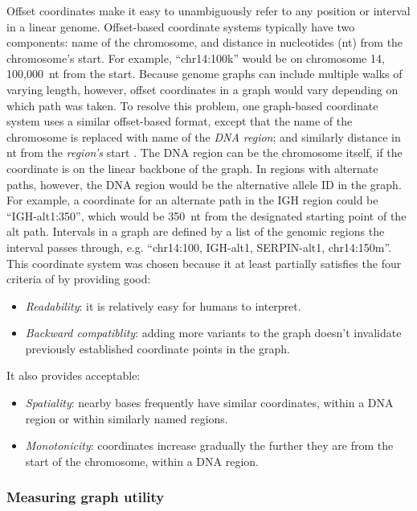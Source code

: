 Offset coordinates make it easy to unambiguously refer to any position or interval in a linear genome.
Offset-based coordinate systems typically have two components: name of the chromosome, and distance in nucleotides (nt) from the chromosome's start.
For example, ``chr14:100k'' would be on chromosome 14, 100,000~nt from the start.
Because genome graphs can include multiple walks of varying length, however, offset coordinates in a graph would vary depending on which path was taken.
To resolve this problem, one graph-based coordinate system uses a similar offset-based format, except that the name of the chromosome is replaced with name of the \emph{DNA region}; and similarly distance in nt from the \emph{region's} start \cite{Rand_2016}. 
The DNA region can be the chromosome itself, if the coordinate is on the linear backbone of the graph.
In regions with alternate paths, however, the DNA region would be the alternative allele ID in the graph.
For example, a coordinate for an alternate path in the IGH region could be ``IGH-alt1:350'', which would be 350~nt from the designated starting point of the alt path.
Intervals in a graph are defined by a list of the genomic regions the interval passes through, e.g. ``chr14:100, IGH-alt1, SERPIN-alt1, chr14:150m''.
This coordinate system was chosen because it at least partially satisfies the four criteria of \citeauthor{Rand_2016} by providing good:
\begin{itemize}
    \item \emph{Readability}: it is relatively easy for humans to interpret.
    \item \emph{Backward compatiblity}: adding more variants to the graph doesn't invalidate previously established coordinate points in the graph.
\end{itemize}
It also provides acceptable:
\begin{itemize}
    \item \emph{Spatiality}: nearby bases frequently have similar coordinates, within a DNA region or within similarly named regions.
    \item \emph{Monotonicity}: coordinates increase gradually the further they are from the start of the chromosome, within a DNA region.
\end{itemize}


\subsubsection{Measuring graph utility}

